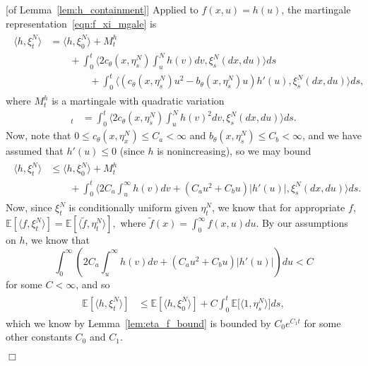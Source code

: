 \documentclass[12pt]{article}
\newenvironment {proof}{{\noindent\bf Proof }}{\hfill $\Box$ \medskip}
\newcommand{\IE}{\mathbb E}
\newcommand{\lp}{\xi}              %
\numberwithin{equation}{section}
\begin{document}
\begin{proof}[of Lemma~\ref{lem:h_containment}]
    Applied to $f(x, u) = h(u)$, the martingale representation~\eqref{eqn:f_xi_mgale} is
    \begin{align*}
    \begin{split}
        \langle h, \lp_t^N \rangle
        &=
        \langle h, \lp_0^N \rangle
        + M^{h}_t 
        \\ & \qquad {}
        +
        \int_0^t
        \big\langle
            2 c_\theta(x, \eta^N_s) \int_u^N h(v) dv
        ,
        \lp_s^N(dx, du) \big \rangle
        ds
        \\ & \qquad \qquad {}
        +
        \int_0^t
        \big\langle
            \left(
                c_\theta(x, \eta^N_s) u^2
                - b_\theta(x, \eta^N_s) u
            \right)
            h'(u)
        ,
        \lp_s^N(dx, du) \big \rangle
        ds ,
    \end{split}
    \end{align*}
    where $M^{h}_t$ is a martingale
    with quadratic variation
    \begin{align*}
        [M^{h}]_t
        &=
        \int_0^t
        \langle 2 c_\theta(x, \eta_s^N) \int_u^N h(v)^2 dv
        ,
        \lp_s^N(dx, du) \big \rangle
        ds .
    \end{align*}
    Now, note that $0 \le c_\theta(x, \eta_x^N) \le C_a < \infty$
    and $b_\theta(x, \eta_s^N) \le C_b < \infty$,
    and we have assumed that $h'(u) \le 0$ (since $h$ is nonincreasing),
    so we may bound
    \begin{align} \label{eqn:hn_bound}
    \begin{split} 
        \langle h, \lp_t^N \rangle
        &\le
        \langle h, \lp_0^N \rangle
        + M^{h}_t
        \\ & \qquad {}
        +
        \int_0^t
        \big\langle
            2 C_a \int_u^\infty h(v) dv
            + \left( C_a u^2 + C_b u \right) |h'(u)|,
        \lp_s^N(dx, du) \big \rangle
        ds .
    \end{split}
    \end{align}
    Now, since $\lp_t^N$ is conditionally uniform given $\eta_t^N$,
    we know that for appropriate $f$,
    $  \IE[\langle f, \lp^N_t \rangle] = \IE[\langle \widetilde{f}, \eta^N_t \rangle] , $
    where $\widetilde{f}(x) = \int_0^\infty f(x, u) du$.
    By our assumptions on $h$,
    we know that
    $$
        \int_0^\infty \left( 2 C_a \int_u^\infty h(v) dv
        + \left( C_a u^2 + C_b u \right) |h'(u)| \right) du
        < C
    $$
    for some $C < \infty$, and so
    \begin{align*}
    \begin{split}
        \IE\left[ \langle h, \lp_t^N \rangle \right]
        &\le
        \IE\left[ \langle h, \lp_0^N \rangle \right]
        +
        C
        \int_0^t
        \IE\bigg[
            \big\langle
            1
            ,
            \eta_s^N \big \rangle
        \bigg]
        ds ,
    \end{split}
    \end{align*}
    which we know by Lemma~\ref{lem:eta_f_bound}
    is bounded by $C_0 e^{C_1 t}$ for some other constants $C_0$ and $C_1$.


\end{proof}
\end{document}
